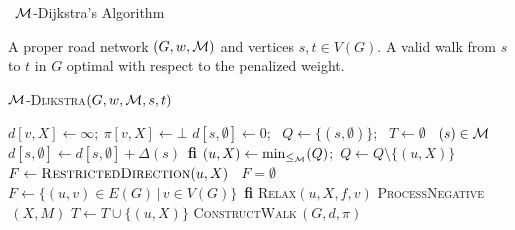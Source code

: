 \documentclass[envcountsect,envcountsame]{llncs}
\renewcommand{\algorithmicendif}{\textbf{fi}}
\newcommand{\OLIF}[2]
{\STATE \algorithmicif \mbox{ #1 }\algorithmicthen\mbox{ #2 }\algorithmicendif}
\begin{document}
\begin{algorithm}[H]
\caption{~$\cal{M}$-Dijkstra's Algorithm}
\label{alg:m-dijkstra}
\begin{algorithmic}[1]
\smallskip
\REQUIRE A proper road network $(G,w,{\cal M})$ and vertices $s,t \in V(G)$.
\ENSURE A valid walk from $s$ to $t$ in $G$ optimal with respect to the 
penalized weight.
\smallskip
\end{algorithmic}
\textsc{${\cal{M}}$-Dijkstra}$(G,w,{\cal{M}},s,t)$
\begin{algorithmic}[1]
  \small
    \STATE $d[v,X] \leftarrow \infty;~ \pi[v,X] \leftarrow \bot$
  \ENDFOR
  \STATE $d[s,\emptyset] \leftarrow 0$;~ $Q \leftarrow \{(s,\emptyset)\}$;~ $T 
  \leftarrow \emptyset$
  \OLIF{$(s) \in {\cal{M}}$}{
    $d[s,\emptyset] \leftarrow d[s,\emptyset] + \Delta(s)$}
  \medskip 
  \vskip 0pt
  \smallskip
    \smallskip
    \STATE $(u,X) \leftarrow  \min_{\le_{\cal M}}(Q)$;~$Q \leftarrow Q \setminus
    \{(u,X)\}$
    \smallskip
    \STATE $F \leftarrow \textsc{RestrictedDirection}(u,X)$
    \OLIF{$F = \emptyset$}{
      $F \leftarrow \{ (u,v) \in E(G) \, | \, v \in V(G)\}$}
    \smallskip
      \STATE \textsc{Relax}$(u,X,f,v)$
        \STATE \textsc{ProcessNegative}$\,(X,M)$ 
      \ENDFOR
    \ENDFOR
    \STATE $T \leftarrow T \cup \{(u,X)\}$ 
  \ENDWHILE
  \STATE \textsc{ConstructWalk}$\,(G,d,\pi)$
    \smallskip
\end{algorithmic}
\end{algorithm}
\end{document}
